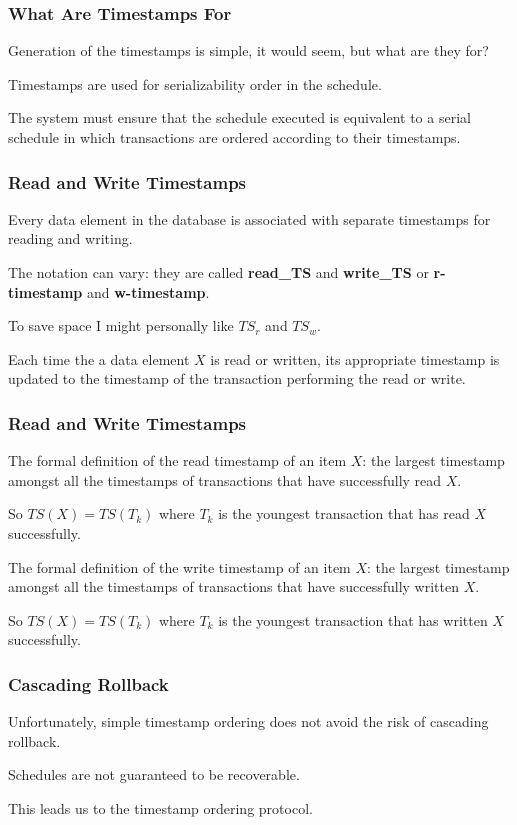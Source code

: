 \begin{frame}
\frametitle{What Are Timestamps For}

Generation of the timestamps is simple, it would seem, but what are they for? 

Timestamps are used for serializability order in the schedule. 

The system must ensure that the schedule executed is equivalent to a serial schedule in which transactions are ordered according to their timestamps.

\end{frame}

\begin{frame}
\frametitle{Read and Write Timestamps}

Every data element in the database is associated with separate timestamps for reading and writing. 

The notation can vary: they are called \textbf{read\_TS} and \textbf{write\_TS} or \textbf{r-timestamp} and \textbf{w-timestamp}. 

To save space I might personally like $T\!S_{r}$ and $T\!S_{w}$. 

Each time the a data element $X$ is read or written, its appropriate timestamp is updated to the timestamp of the transaction performing the read or write.

\end{frame}

\begin{frame}
\frametitle{Read and Write Timestamps}

The formal definition of the read timestamp of an item $X$: the largest timestamp amongst all the timestamps of transactions that have successfully read $X$. 

So $T\!S(X) = T\!S(T_{k})$ where $T_{k}$ is the youngest transaction that has read $X$ successfully.

The formal definition of the write timestamp of an item $X$: the largest timestamp amongst all the timestamps of transactions that have successfully written $X$. 

So $T\!S(X) = T\!S(T_{k})$ where $T_{k}$ is the youngest transaction that has written $X$ successfully.

\end{frame}

\begin{frame}
\frametitle{Cascading Rollback}

Unfortunately, simple timestamp ordering does not avoid the risk of cascading rollback. 

Schedules are not guaranteed to be recoverable. 

This leads us to the \alert{timestamp ordering protocol}.

\end{frame}



